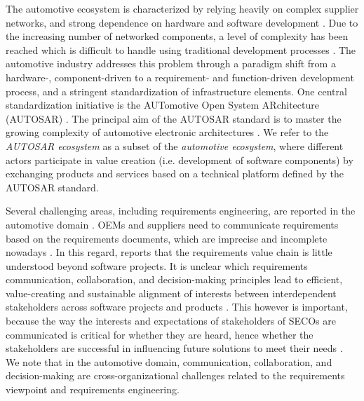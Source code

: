 The automotive ecosystem is characterized by relying heavily on complex supplier networks, and strong dependence on hardware and software development \cite {knauss2014towards}.
Due to the increasing number of networked components, a level of complexity has been reached which is difficult to handle using traditional development processes \cite{fennel2006achievements}. 
The automotive industry addresses this problem through a paradigm shift from a hardware-, component-driven to a requirement- and function-driven development process, and a stringent standardization of infrastructure elements. %
One central standardization initiative is the AUTomotive Open System ARchitecture (AUTOSAR) \cite{fennel2006achievements}. 
The principal aim of the AUTOSAR standard is to master the growing complexity of automotive electronic architectures \cite{furst2009autosar}.
We refer to the \emph{AUTOSAR ecosystem} as a subset of the \emph{automotive ecosystem}, where different actors participate in value creation (i.e. development of software components) by exchanging products and services based on a technical platform defined by the AUTOSAR standard.

Several challenging areas, including requirements engineering, are reported in the automotive domain \cite{broy2006challenges}.
OEMs and suppliers need to communicate requirements based on the requirements documents, which are imprecise and incomplete nowadays \cite{broy2006challenges}.
In this regard, \cite{fricker2010requirements} reports that the requirements value chain is little understood beyond software projects. 
It is unclear which requirements communication, collaboration, and decision-making principles lead to efficient, value-creating and sustainable alignment of interests between interdependent stakeholders across software projects and products \cite{fricker2010requirements}. 
This however is important, because the way the interests and expectations of stakeholders of SECOs are communicated is critical for whether they are heard, hence whether the stakeholders are successful in influencing future solutions to meet their needs \cite{fricker2009specification}.
We note that in the automotive domain, communication, collaboration, and decision-making are cross-organizational challenges related to the requirements viewpoint and requirements engineering.


